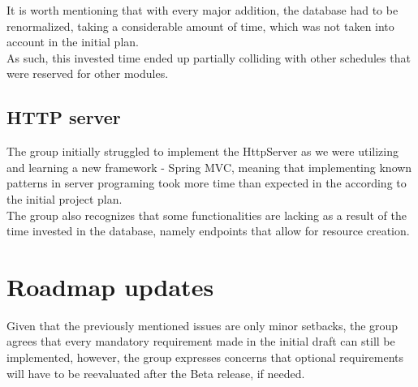    It is worth mentioning that with every major addition, the database had to be renormalized, taking a considerable amount of time,
    which was not taken into account in the initial plan.\\

    As such, this invested time ended up partially colliding with other schedules that were
    reserved for other modules.

    \subsection{HTTP server}

    The group initially struggled to implement the HttpServer as we were utilizing and learning a new framework - Spring MVC, meaning that implementing
    known patterns in server programing took more time than expected in the according to the initial project plan.\\

    The group also recognizes that some functionalities are lacking as a result of the time invested in the database, namely endpoints that allow for resource creation.

    \section{Roadmap updates}

    Given that the previously mentioned issues are only minor setbacks, the group agrees that every mandatory requirement made in the initial draft can still be implemented,
    however, the group expresses concerns that optional requirements will have to be reevaluated after the Beta release, if needed.